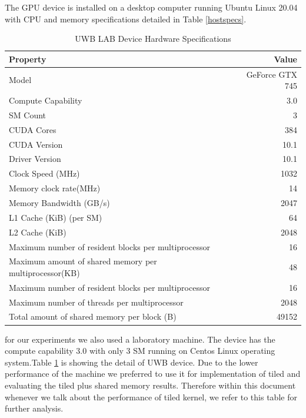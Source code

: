 \documentclass[12pt, letterpaper]{article}
\begin{document}
The GPU device is installed on a desktop computer running Ubuntu Linux 20.04
with CPU and memory specifications detailed in Table \ref{hostspecs}.


\begin{table}[htbp]
  \centering
  \caption{UWB LAB Device Hardware Specifications}
  \label{specslab}
  \begin{tabular}{lr}
      \toprule
          Property                & Value                           \\
          \midrule
          Model                   & GeForce GTX 745                 \\
          Compute Capability      & 3.0                             \\
          SM Count                & 3                               \\
          CUDA Cores              & 384                            \\
          CUDA Version            & 10.1                            \\
          Driver Version          & 10.1                          \\
          Clock Speed (MHz)       & 1032                            \\
          Memory clock rate(MHz)  & 14                              \\
          Memory Bandwidth (GB/s) & 2047                             \\
          L1 Cache (KiB) (per SM) & 64                              \\
          L2 Cache (KiB)          & 2048                             \\
          Maximum number of resident blocks per multiprocessor &16   \\
          Maximum amount of shared memory per multiprocessor(KB) & 48 \\
          Maximum number of resident blocks per multiprocessor &16 \\
          Maximum number of threads per multiprocessor  &2048 \\
          Total amount of shared memory per block (B)   &49152 \\
          \bottomrule
  \end{tabular}
\end{table}

for our experiments we also used a laboratory machine. The device has the compute capability
3.0 with only 3 SM running on Centos Linux operating system.Table \ref{specslab}
is showing the detail of UWB device. Due to the lower performance of the machine
we preferred to use it for implementation of tiled and evaluating the tiled plus
shared memory results. Therefore within this document whenever we talk about the
performance of tiled kernel, we refer to this table for further analysis.
\end{document}
